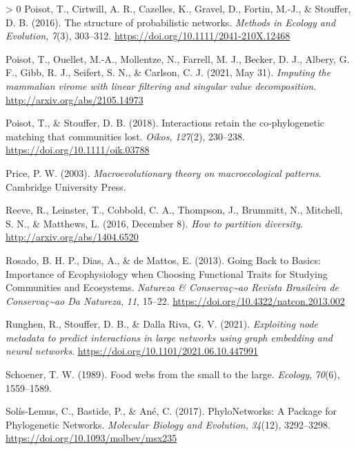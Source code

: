 \documentclass[10pt,oneside]{article}
\newlength{\cslhangindent}
\newenvironment{CSLReferences}[3] %
 {%
  \setlength{\parindent}{0pt}
  \ifodd #1 \everypar{\setlength{\hangindent}{\cslhangindent}}\ignorespaces\fi
  \ifnum #2 > 0
  \setlength{\parskip}{#2\baselineskip}
  \fi
 }%
 {}
\begin{document}
\begin{CSLReferences}{1}{0}
\leavevmode\hypertarget{ref-Poisot2016StrPro}{}%
Poisot, T., Cirtwill, A. R., Cazelles, K., Gravel, D., Fortin, M.-J., \&
Stouffer, D. B. (2016). The structure of probabilistic networks.
\emph{Methods in Ecology and Evolution}, \emph{7}(3), 303--312.
\url{https://doi.org/10.1111/2041-210X.12468}

\leavevmode\hypertarget{ref-Poisot2021ImpMam}{}%
Poisot, T., Ouellet, M.-A., Mollentze, N., Farrell, M. J., Becker, D.
J., Albery, G. F., Gibb, R. J., Seifert, S. N., \& Carlson, C. J. (2021,
May 31). \emph{Imputing the mammalian virome with linear filtering and
singular value decomposition}. \url{http://arxiv.org/abs/2105.14973}

\leavevmode\hypertarget{ref-Poisot2018IntRet}{}%
Poisot, T., \& Stouffer, D. B. (2018). Interactions retain the
co-phylogenetic matching that communities lost. \emph{Oikos},
\emph{127}(2), 230--238. \url{https://doi.org/10.1111/oik.03788}

\leavevmode\hypertarget{ref-Price2003MacThe}{}%
Price, P. W. (2003). \emph{Macroevolutionary theory on macroecological
patterns}. Cambridge University Press.

\leavevmode\hypertarget{ref-Reeve2016HowPar}{}%
Reeve, R., Leinster, T., Cobbold, C. A., Thompson, J., Brummitt, N.,
Mitchell, S. N., \& Matthews, L. (2016, December 8). \emph{How to
partition diversity}. \url{http://arxiv.org/abs/1404.6520}

\leavevmode\hypertarget{ref-Rosado2013GoiBac}{}%
Rosado, B. H. P., Dias, A., \& de Mattos, E. (2013). Going Back to
Basics: Importance of Ecophysiology when Choosing Functional Traits for
Studying Communities and Ecosystems. \emph{Natureza \&
Conservaç\textasciitilde ao Revista Brasileira de
Conservaç\textasciitilde ao Da Natureza}, \emph{11}, 15--22.
\url{https://doi.org/10.4322/natcon.2013.002}

\leavevmode\hypertarget{ref-Runghen2021ExpNod}{}%
Runghen, R., Stouffer, D. B., \& Dalla Riva, G. V. (2021).
\emph{Exploiting node metadata to predict interactions in large networks
using graph embedding and neural networks}.
\url{https://doi.org/10.1101/2021.06.10.447991}

\leavevmode\hypertarget{ref-Schoener1989FooWeb}{}%
Schoener, T. W. (1989). Food webs from the small to the large.
\emph{Ecology}, \emph{70}(6), 1559--1589.

\leavevmode\hypertarget{ref-Solis-Lemus2017PhyPac}{}%
Solís-Lemus, C., Bastide, P., \& Ané, C. (2017). PhyloNetworks: A
Package for Phylogenetic Networks. \emph{Molecular Biology and
Evolution}, \emph{34}(12), 3292--3298.
\url{https://doi.org/10.1093/molbev/msx235}


\end{CSLReferences}
\end{document}
